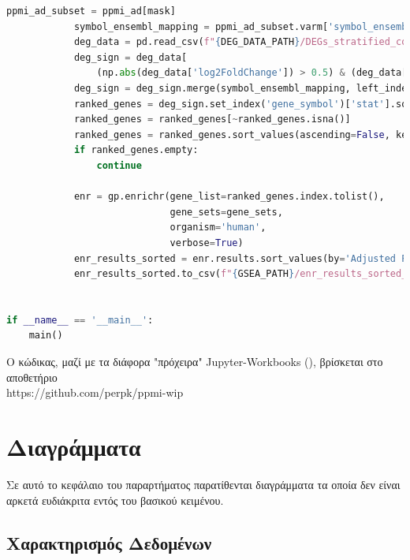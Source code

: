 \documentclass[12pt]{report}
\begin{document}
\begin{lstlisting}[language=Python,caption={gsea\_stratified\_batch\_consolidated\_visits.py: Ανάλυση εμπλουτισμού με χρήση της βιβλιοθήκης gseapy σε Python}, label=lst:gseastratifiedbatchconsolidatedvisits]
            ppmi_ad_subset = ppmi_ad[mask]
            symbol_ensembl_mapping = ppmi_ad_subset.varm['symbol_ensembl_mapping']
            deg_data = pd.read_csv(f"{DEG_DATA_PATH}/DEGs_stratified_consoVisits_{gender}_{age_group}.csv", index_col=0)
            deg_sign = deg_data[
                (np.abs(deg_data['log2FoldChange']) > 0.5) & (deg_data['padj'] < 0.05)]
            deg_sign = deg_sign.merge(symbol_ensembl_mapping, left_index=True, right_index=True)
            ranked_genes = deg_sign.set_index('gene_symbol')['stat'].sort_values(ascending=False)
            ranked_genes = ranked_genes[~ranked_genes.isna()]
            ranked_genes = ranked_genes.sort_values(ascending=False, key=abs)
            if ranked_genes.empty:
                continue

            enr = gp.enrichr(gene_list=ranked_genes.index.tolist(),
                             gene_sets=gene_sets,
                             organism='human',
                             verbose=True)
            enr_results_sorted = enr.results.sort_values(by='Adjusted P-value', ascending=True)
            enr_results_sorted.to_csv(f"{GSEA_PATH}/enr_results_sorted_consoVisits_{gender}_{age_group}.csv")


if __name__ == '__main__':
    main()
    \end{lstlisting}
        Ο κώδικας, μαζί με τα διάφορα "πρόχειρα" Jupyter-Workbooks (\emph{\cite{Kluyver2016JupyterWorkflows}}), βρίσκεται στο αποθετήριο \\https://github.com/perpk/ppmi-wip
    
    \newpage
    \section*{Διαγράμματα}\label{thesis:plots}
        \vspace{-0.6cm}
        Σε αυτό το κεφάλαιο του παραρτήματος παρατίθενται διαγράμματα τα οποία δεν είναι αρκετά ευδιάκριτα εντός του βασικού κειμένου.
        \subsection*{Χαρακτηρισμός Δεδομένων}
\end{document}
